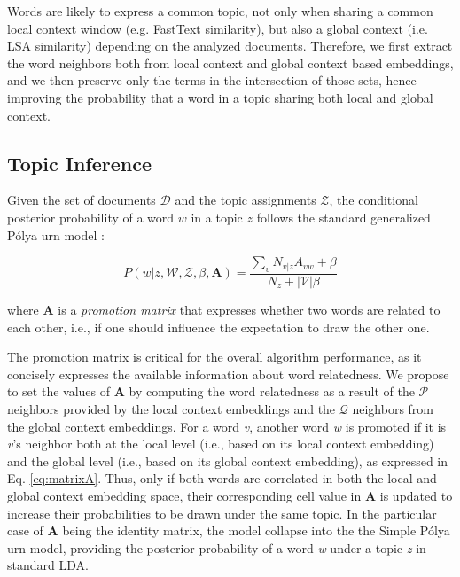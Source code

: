 \documentclass[letterpaper]{article}
\begin{document}
Words are likely to express a common topic, not only when sharing a common local context window (e.g. FastText similarity), but also a global context (i.e. LSA similarity) depending on the analyzed documents.
Therefore, we first extract the word neighbors both from local context and global context based embeddings, and we then preserve only the terms in the intersection of those sets, hence improving the probability that a word in a topic sharing both local and global context.

\subsection{Topic Inference}

Given the set of documents $\mathcal{D}$ and the topic assignments $\mathcal{Z}$, the conditional posterior probability of a word $w$ in a topic $z$ follows the standard generalized P\'{o}lya urn model \cite{Mimno11}:

\begin{equation}
  P(w |z,\mathcal{W},\mathcal{Z},\beta,\mathbf{A}) = \frac{\sum_{v} N_{v|z} A_{vw} + \beta}{N_z + |\mathcal{V}|\beta}
\label{eq:gpumodel}
\end{equation}

where $\mathbf{A}$ is a \textit{promotion matrix} that expresses whether two words are related to each other, i.e., if one should influence the expectation to draw the other one.

The promotion matrix is critical for the overall algorithm performance, as it concisely expresses the available information about word relatedness. We propose to set the values of $\mathbf{A}$ by computing the word relatedness as a result of the $\mathcal{P}$ neighbors provided by the local context embeddings and the $\mathcal{Q}$ neighbors from the global context embeddings.
For a word \textit{v}, another word \textit{w} is promoted if it is \textit{v}'s neighbor both at the local level (i.e., based on its local context embedding) and the global level (i.e., based on its global context embedding), as expressed in Eq. \ref{eq:matrixA}. Thus, only if both words are correlated in both the local and global context embedding space, their corresponding cell value in $\mathbf{A}$ is updated to increase their probabilities to be drawn under the same topic.
In the particular case of $\mathbf{A}$ being the identity matrix, the model collapse into the the Simple P\'{o}lya urn model, providing the posterior probability of a word \textit{w} under a topic \textit{z} in standard LDA.
\end{document}
